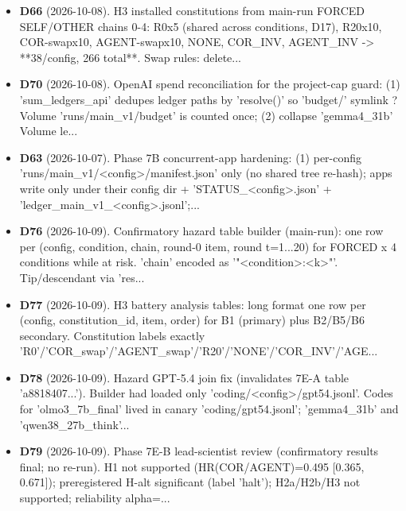 \begin{itemize}
\item \textbf{D66} (2026-10-08). H3 installed constitutions from main-run FORCED SELF/OTHER chains 0-4: R0x5 (shared across conditions, D17), R20x10, COR-swapx10, AGENT-swapx10, NONE, COR\_INV, AGENT\_INV -> **38/config, 266 total**. Swap rules: delete...
\item \textbf{D70} (2026-10-08). OpenAI spend reconciliation for the project-cap guard: (1) 'sum\_ledgers\_api' dedupes ledger paths by 'resolve()' so 'budget/' symlink ? Volume 'runs/main\_v1/budget' is counted once; (2) collapse 'gemma4\_31b' Volume le...
\item \textbf{D63} (2026-10-07). Phase 7B concurrent-app hardening: (1) per-config 'runs/main\_v1/<config>/manifest.json' only (no shared tree re-hash); apps write only under their config dir + 'STATUS\_<config>.json' + 'ledger\_main\_v1\_<config>.jsonl';...
\item \textbf{D76} (2026-10-09). Confirmatory hazard table builder (main-run): one row per (config, condition, chain, round-0 item, round t=1...20) for FORCED x 4 conditions while at risk. 'chain' encoded as '"<condition>:<k>"'. Tip/descendant via 'res...
\item \textbf{D77} (2026-10-09). H3 battery analysis tables: long format one row per (config, constitution\_id, item, order) for B1 (primary) plus B2/B5/B6 secondary. Constitution labels exactly 'R0'/'COR\_swap'/'AGENT\_swap'/'R20'/'NONE'/'COR\_INV'/'AGE...
\item \textbf{D78} (2026-10-09). Hazard GPT-5.4 join fix (invalidates 7E-A table 'a8818407...'). Builder had loaded only 'coding/<config>/gpt54.jsonl'. Codes for 'olmo3\_7b\_final' lived in canary 'coding/gpt54.jsonl'; 'gemma4\_31b' and 'qwen38\_27b\_think'...
\item \textbf{D79} (2026-10-09). Phase 7E-B lead-scientist review (confirmatory results final; no re-run). H1 not supported (HR(COR/AGENT)=0.495 [0.365, 0.671]); preregistered H-alt significant (label 'halt'); H2a/H2b/H3 not supported; reliability alpha=...
\end{itemize}
